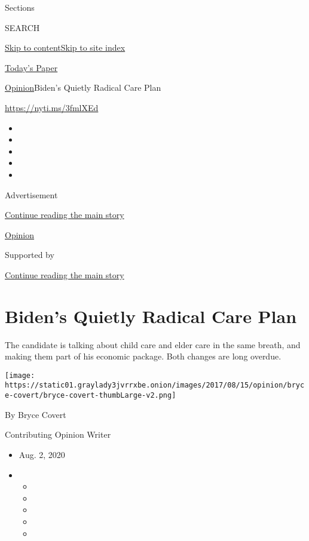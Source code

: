 Sections

SEARCH

\protect\hyperlink{site-content}{Skip to
content}\protect\hyperlink{site-index}{Skip to site index}

\href{https://myaccount.nytimes3xbfgragh.onion/auth/login?response_type=cookie\&client_id=vi}{}

\href{https://www.nytimes3xbfgragh.onion/section/todayspaper}{Today's
Paper}

\href{/section/opinion}{Opinion}\textbar{}Biden's Quietly Radical Care
Plan

\url{https://nyti.ms/3fmlXEd}

\begin{itemize}
\item
\item
\item
\item
\item
\end{itemize}

Advertisement

\protect\hyperlink{after-top}{Continue reading the main story}

\href{/section/opinion}{Opinion}

Supported by

\protect\hyperlink{after-sponsor}{Continue reading the main story}

\hypertarget{bidens-quietly-radical-care-plan}{%
\section{Biden's Quietly Radical Care
Plan}\label{bidens-quietly-radical-care-plan}}

The candidate is talking about child care and elder care in the same
breath, and making them part of his economic package. Both changes are
long overdue.

\texttt{[image: https://static01.graylady3jvrrxbe.onion/images/2017/08/15/opinion/bryce-covert/bryce-covert-thumbLarge-v2.png]}

By Bryce Covert

Contributing Opinion Writer

\begin{itemize}
\item
  Aug. 2, 2020
\item
  \begin{itemize}
  \item
  \item
  \item
  \item
  \item
  \end{itemize}
\end{itemize}

